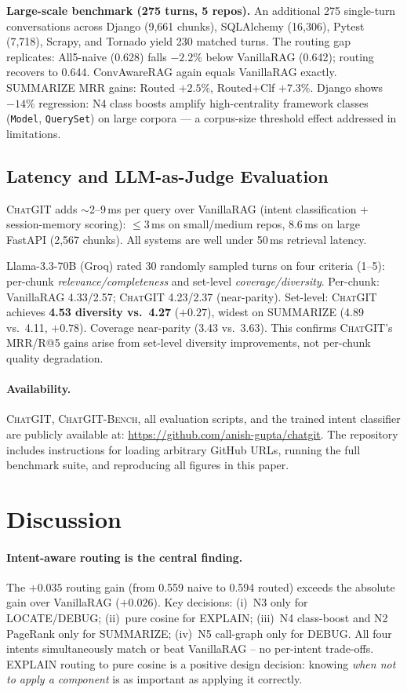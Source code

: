 \documentclass[runningheads]{llncs}
\newcommand{\chatgit}{\textsc{ChatGIT}\xspace}
\newcommand{\conv}{\textsc{ChatGIT-Bench}\xspace}
\begin{document}
\textbf{Large-scale benchmark (275 turns, 5 repos).} An additional 275
single-turn conversations across Django (9,661 chunks), SQLAlchemy (16,306),
Pytest (7,718), Scrapy, and Tornado yield 230 matched turns. The routing
gap replicates: All5-naive (0.628) falls $-2.2\%$ below VanillaRAG (0.642);
routing recovers to 0.644. ConvAwareRAG again equals VanillaRAG exactly.
SUMMARIZE MRR gains: Routed $+2.5\%$, Routed+Clf $+7.3\%$.
Django shows $-14\%$ regression: N4 class boosts amplify high-centrality
framework classes (\texttt{Model}, \texttt{QuerySet}) on large corpora
--- a corpus-size threshold effect addressed in limitations.

\subsection{Latency and LLM-as-Judge Evaluation}

\chatgit adds ${\sim}$2--9\,ms per query over VanillaRAG (intent
classification + session-memory scoring): $\leq$3\,ms on small/medium repos,
8.6\,ms on large FastAPI (2,567 chunks). All systems are well under 50\,ms
retrieval latency.

Llama-3.3-70B (Groq) rated 30 randomly sampled turns on four criteria
(1--5): per-chunk \emph{relevance/completeness} and set-level
\emph{coverage/diversity}. Per-chunk: VanillaRAG 4.33/2.57; \chatgit
4.23/2.37 (near-parity). Set-level: \chatgit achieves \textbf{4.53 diversity
vs.\ 4.27} ($+0.27$), widest on SUMMARIZE (4.89 vs.\ 4.11, $+0.78$).
Coverage near-parity (3.43 vs.\ 3.63). This confirms \chatgit's MRR/R@5
gains arise from set-level diversity improvements, not per-chunk quality
degradation.

\paragraph{Availability.}
\chatgit, \conv, all evaluation scripts, and the trained intent classifier
are publicly available at:
\url{https://github.com/anish-gupta/chatgit}.
The repository includes instructions for loading arbitrary GitHub URLs,
running the full benchmark suite, and reproducing all figures in this paper.

\section{Discussion}
\label{sec:disc}

\paragraph{Intent-aware routing is the central finding.}
The $+0.035$ routing gain (from 0.559 naive to 0.594 routed) exceeds the
absolute gain over VanillaRAG ($+0.026$). Key decisions: (i)~N3 only for
LOCATE/DEBUG; (ii)~pure cosine for EXPLAIN; (iii)~N4 class-boost and N2
PageRank only for SUMMARIZE; (iv)~N5 call-graph only for DEBUG. All four
intents simultaneously match or beat VanillaRAG -- no per-intent trade-offs.
EXPLAIN routing to pure cosine is a positive design decision: knowing
\emph{when not to apply a component} is as important as applying it correctly.
\end{document}
